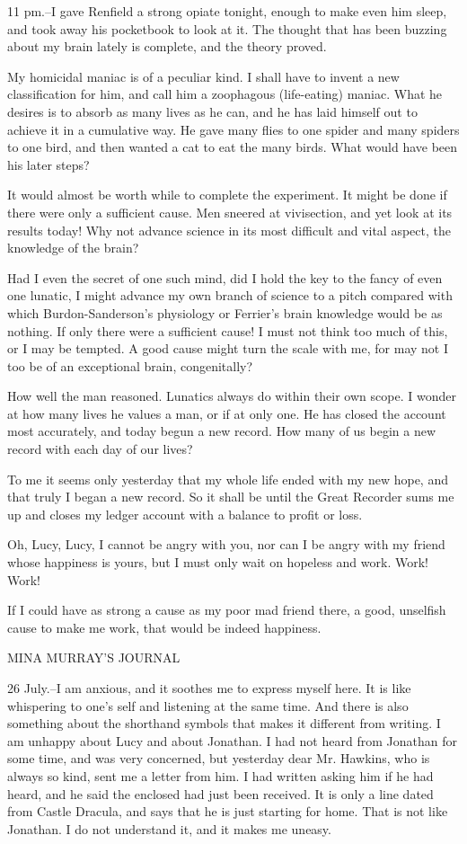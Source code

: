 11 pm.--I gave Renfield a strong opiate tonight, enough to make even him sleep, and took away his pocketbook to look at it. The thought that has been buzzing about my brain lately is complete, and the theory proved. 

My homicidal maniac is of a peculiar kind. I shall have to invent a new classification for him, and call him a zoophagous (life-eating) maniac. What he desires is to absorb as many lives as he can, and he has laid himself out to achieve it in a cumulative way. He gave many flies to one spider and many spiders to one bird, and then wanted a cat to eat the many birds. What would have been his later steps? 

It would almost be worth while to complete the experiment. It might be done if there were only a sufficient cause. Men sneered at vivisection, and yet look at its results today! Why not advance science in its most difficult and vital aspect, the knowledge of the brain? 

Had I even the secret of one such mind, did I hold the key to the fancy of even one lunatic, I might advance my own branch of science to a pitch compared with which Burdon-Sanderson's physiology or Ferrier's brain knowledge would be as nothing. If only there were a sufficient cause! I must not think too much of this, or I may be tempted. A good cause might turn the scale with me, for may not I too be of an exceptional brain, congenitally? 

How well the man reasoned. Lunatics always do within their own scope. I wonder at how many lives he values a man, or if at only one. He has closed the account most accurately, and today begun a new record. How many of us begin a new record with each day of our lives? 

To me it seems only yesterday that my whole life ended with my new hope, and that truly I began a new record. So it shall be until the Great Recorder sums me up and closes my ledger account with a balance to profit or loss. 

Oh, Lucy, Lucy, I cannot be angry with you, nor can I be angry with my friend whose happiness is yours, but I must only wait on hopeless and work. Work! Work! 

If I could have as strong a cause as my poor mad friend there, a good, unselfish cause to make me work, that would be indeed happiness. 

MINA MURRAY'S JOURNAL 

26 July.--I am anxious, and it soothes me to express myself here. It is like whispering to one's self and listening at the same time. And there is also something about the shorthand symbols that makes it different from writing. I am unhappy about Lucy and about Jonathan. I had not heard from Jonathan for some time, and was very concerned, but yesterday dear Mr. Hawkins, who is always so kind, sent me a letter from him. I had written asking him if he had heard, and he said the enclosed had just been received. It is only a line dated from Castle Dracula, and says that he is just starting for home. That is not like Jonathan. I do not understand it, and it makes me uneasy. 

